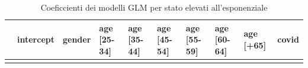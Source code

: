 \documentclass[
  italian,
  a4paper,
  a4paper,
  twoside,
  open=right,
  12pt]{scrbook}
\theoremstyle{definition}
\theoremstyle{remark}
\begin{document}
\begin{longtable}[]{@{}
  >{\raggedright\arraybackslash}p{}
  >{\raggedleft\arraybackslash}p{}
  >{\raggedleft\arraybackslash}p{}
  >{\raggedleft\arraybackslash}p{}
  >{\raggedleft\arraybackslash}p{}
  >{\raggedleft\arraybackslash}p{}
  >{\raggedleft\arraybackslash}p{}
  >{\raggedleft\arraybackslash}p{}
  >{\raggedleft\arraybackslash}p{}
  >{\raggedleft\arraybackslash}p{}@{}}
\caption{Coeficcienti dei modelli GLM per stato elevati
all'esponenziale}\label{tbl-coeff_em}\tabularnewline
\toprule\noalign{}
\begin{minipage}[b]{\linewidth}\raggedright
\end{minipage} & \begin{minipage}[b]{\linewidth}\raggedleft
intercept
\end{minipage} & \begin{minipage}[b]{\linewidth}\raggedleft
gender
\end{minipage} & \begin{minipage}[b]{\linewidth}\raggedleft
age {[}25-34{]}
\end{minipage} & \begin{minipage}[b]{\linewidth}\raggedleft
age {[}35-44{]}
\end{minipage} & \begin{minipage}[b]{\linewidth}\raggedleft
age {[}45-54{]}
\end{minipage} & \begin{minipage}[b]{\linewidth}\raggedleft
age {[}55-59{]}
\end{minipage} & \begin{minipage}[b]{\linewidth}\raggedleft
age {[}60-64{]}
\end{minipage} & \begin{minipage}[b]{\linewidth}\raggedleft
age {[}+65{]}
\end{minipage} & \begin{minipage}[b]{\linewidth}\raggedleft
covid
\end{minipage} \\
\midrule\noalign{}
\endfirsthead
\toprule\noalign{}
\begin{minipage}[b]{\linewidth}\raggedright

\end{minipage}
\end{longtable}
\end{document}
